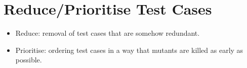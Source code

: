 
\section{Reduce/Prioritise Test Cases}\label{sec:reduceprioritise}

\begin{itemize}
	\item Reduce: removal of test cases that are somehow redundant.
	\item Prioritise: ordering test cases in a way that mutants are killed as early as possible.
\end{itemize}

